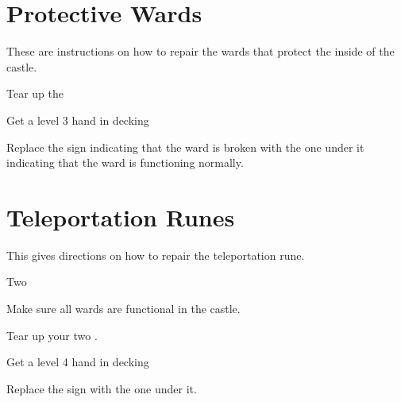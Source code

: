 \documentclass[green]{guildcamp2}
\begin{document}
\name{\gOnyxRep{}}

\section{Protective Wards}
These are instructions on how to repair the wards that protect the inside of the castle.

\begin{enum}[Requirements]
	\item \iForsythia{}
	\item \iWardBook{}
\end{enum}
	
\begin{enum}[Directions]
	\item Tear up the \iForsythia{}
	\item Get a level 3 hand in decking
	\item Replace the sign indicating that the ward is broken with the one under it indicating that the ward is functioning normally.
\end{enum}


\section{Teleportation Runes}
This gives directions on how to repair the teleportation rune.

\begin{enum}[Requirements]
	\item Two \iForsythia{}
	\item \iWardBook{}
\end{enum}

\begin{enum}[Directions]
	\item Make sure all wards are functional in the castle.
	\item Tear up your two \iForsythia{}.
	\item Get a level 4 hand in decking
	\item Replace the sign with the one under it.
\end{enum}
	
\end{document}

